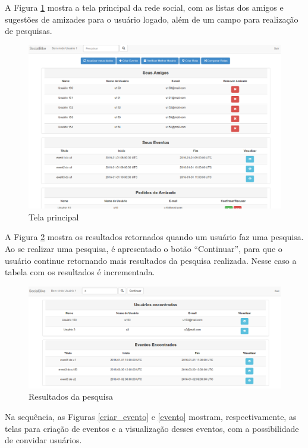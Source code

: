 A Figura \ref{home} mostra a tela principal da rede social, com as listas dos amigos e sugestões de amizades para o usuário logado, além de um campo para realização de pesquisas.

\newpage
\begin{figure}[!h]
	\centering
	\includegraphics[scale=0.45]{figuras/resultados/home.eps}
	\caption[Tela principal]{Tela principal}
	\label{home}
\end{figure}

A Figura \ref{pesquisa} mostra os resultados retornados quando um usuário faz uma pesquisa. Ao se realizar uma pesquisa, é apresentado o botão ``Continuar'', para que o usuário continue retornando mais resultados da pesquisa realizada. Nesse caso a tabela com os resultados é incrementada.

\begin{figure}[!h]
	\centering
	\includegraphics[scale=0.45]{figuras/resultados/pesquisa.eps}
	\caption[Resultados da pesquisa]{Resultados da pesquisa}
	\label{pesquisa}
\end{figure}

Na sequência, as Figuras \ref{criar_evento} e \ref{evento} mostram, respectivamente, as telas para criação de eventos e a visualização desses eventos, com a possibilidade de convidar usuários.

